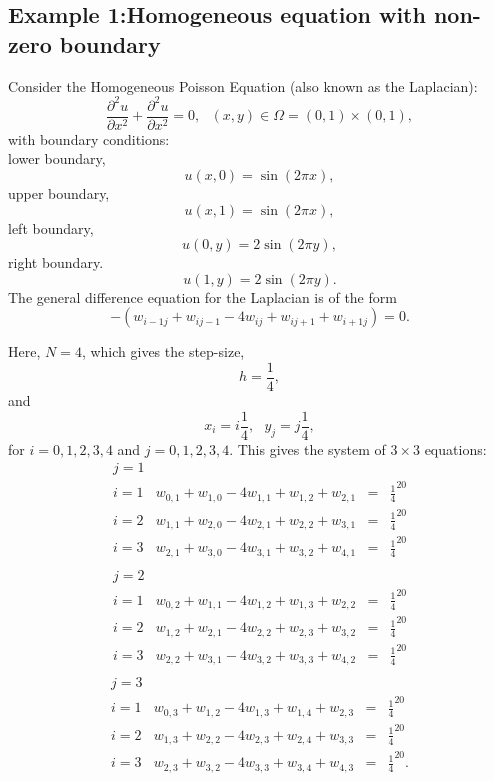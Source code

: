 \subsection{Example 1:Homogeneous equation with non-zero boundary}
Consider the Homogeneous Poisson Equation (also known as the Laplacian):\[ \frac{\partial^2 u}{\partial x^2}+\frac{\partial^2 u}{\partial x^2}=0, \ \ \ (x,y) \in \Omega=(0,1)\times (0,1), \]
with boundary conditions:\\
lower boundary,
\[u(x,0) = \sin(2\pi x), \]
upper boundary,
\[u(x,1) = \sin(2\pi x),  \]
left boundary,
\[u(0,y) = 2\sin(2\pi y), \]
right boundary.
\[u(1,y) =  2\sin(2\pi y). \]
The general difference equation for the Laplacian is of the form
\[-(w_{i-1j}+w_{ij-1}-4w_{ij}+w_{ij+1}+w_{i+1j})=0. \]

Here, $N=4$, which gives the step-size,
\[h=\frac{1}{4},\]
and
\[x_i=i\frac{1}{4}, \ \ \ y_j=j\frac{1}{4},\]
for $i=0,1,2,3,4$ and $j=0,1,2,3,4$.
This gives the system of $3\times 3$ equations:
\[\begin{array}{l|rcl}
j=1\\
i=1&w_{0,1}+w_{1,0}-4w_{1,1}+w_{1,2}+w_{2,1}&=&\frac{1}{4}^20\\
i=2&w_{1,1}+w_{2,0}-4w_{2,1}+w_{2,2}+w_{3,1}&=&\frac{1}{4}^20\\
i=3&w_{2,1}+w_{3,0}-4w_{3,1}+w_{3,2}+w_{4,1}&=&\frac{1}{4}^20\\
\end{array}
\]	
\[\begin{array}{l|rcl}
j=2\\
i=1&w_{0,2}+w_{1,1}-4w_{1,2}+w_{1,3}+w_{2,2}&=&\frac{1}{4}^20\\
i=2&w_{1,2}+w_{2,1}-4w_{2,2}+w_{2,3}+w_{3,2}&=&\frac{1}{4}^20\\
i=3&w_{2,2}+w_{3,1}-4w_{3,2}+w_{3,3}+w_{4,2}&=&\frac{1}{4}^20\\
\end{array}
\]	
\[\begin{array}{l|rcl}
j=3\\
i=1&w_{0,3}+w_{1,2}-4w_{1,3}+w_{1,4}+w_{2,3}&=&\frac{1}{4}^20\\
i=2&w_{1,3}+w_{2,2}-4w_{2,3}+w_{2,4}+w_{3,3}&=&\frac{1}{4}^20\\
i=3&w_{2,3}+w_{3,2}-4w_{3,3}+w_{3,4}+w_{4,3}&=&\frac{1}{4}^20.
\end{array}
\]	

